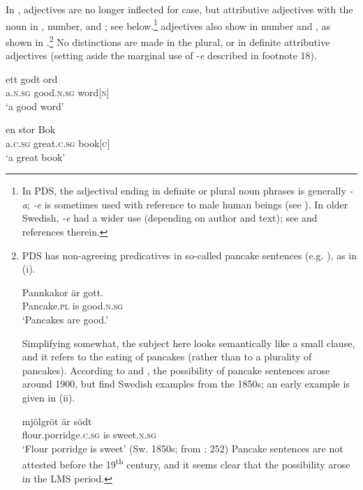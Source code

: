 \documentclass[output=paper]{langscibook}
\begin{document}
In , adjectives are no longer inflected for case, but attributive adjectives  with the noun in , number, and ; see  below.\footnote{In PDS, the adjectival ending in definite or plural noun phrases is generally \textit{{}-a}; \textit{{}-e} is sometimes used with reference to male human beings (see \citealt{Bylin2016}). In older Swedish, \textit{{}-e} had a wider use (depending on author and text); see \citet{Larsson2004} and references therein.}   adjectives also show  in number and , as shown in .\footnote{PDS has non-agreeing predicatives in so-called pancake sentences (e.g. \citealt{Josefsson2009}), as in (i).

\ea
\gll  Pannkakor   är   gott. \\
Pancake\textsc{.pl}  is   good\textsc{.n.sg}\\
\glt ‘Pancakes are good.’
\z

Simplifying somewhat, the subject here looks semantically like a small clause, and it refers to the eating of pancakes (rather than to a plurality of pancakes). According to \citet{Faarlund1977} and \citet{Josefsson2014}, the possibility of pancake sentences arose around 1900, but \citet{HaugenEtAl2019} find Swedish examples from the 1850s; an early example is given in (ii).

\ea \gll mjölgröt     är södt\\
        flour.porridge\textsc{.c.sg}   is sweet\textsc{.n.sg}\\
        \glt ‘Flour porridge is sweet’ (Sw. 1850s; from \citealt{HaugenEtAl2019}: 252)
\z Pancake sentences are not attested before the 19\textsuperscript{th} century, and it seems clear that the possibility arose in the LMS period.} No  distinctions are made in the plural, or in definite attributive adjectives (setting aside the marginal use of -\textit{e} described in footnote 18).


\ea\label{ex:intro:35}
\ea\label{ex:intro:35b}
\gll  ett       godt         ord\\
a.\textsc{n.sg}  good.\textsc{n.sg}  word[\textsc{n]}\\
\glt ‘a good word’

\ex\label{ex:intro:35a}
\gll  en       stor           Bok \\
a.\textsc{c.sg}  great.\textsc{c.sg}  book[\textsc{c]}\\
\glt ‘a great book’
\end{document}
